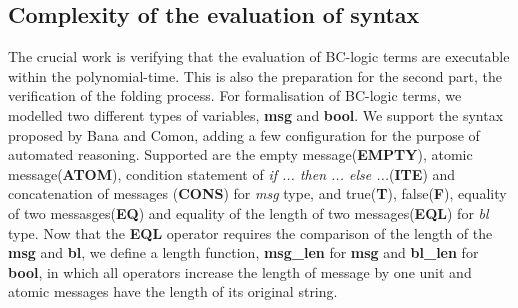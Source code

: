 \documentclass[conference]{IEEEtran}
\begin{document}
\subsection{Complexity of the evaluation of syntax}
The crucial work is verifying that the evaluation of BC-logic terms are executable within the polynomial-time. This is also the preparation for the second part, the verification of the folding process. For formalisation of BC-logic terms, we modelled two different types of variables, \textbf{msg} and \textbf{bool}. We support the syntax proposed by Bana and Comon, adding a few configuration for the purpose of automated reasoning.
Supported are the empty message(\textbf{EMPTY}), atomic message(\textbf{ATOM}), condition statement of \textit{if ... then ... else ...}(\textbf{ITE}) and concatenation of messages (\textbf{CONS}) for \textit{msg} type, and true(\textbf{T}), false(\textbf{F}), equality of two messasges(\textbf{EQ}) and equality of the length of two messages(\textbf{EQL}) for \textit{bl} type. Now that the \textbf{EQL} operator requires the comparison of the length of the \textbf{msg} and \textbf{bl}, we define a length function, \textbf{msg\_len} for \textbf{msg} and \textbf{bl\_len} for \textbf{bool}, in which all operators increase the length of message by one unit and atomic messages have the length of its original string.
\end{document}
